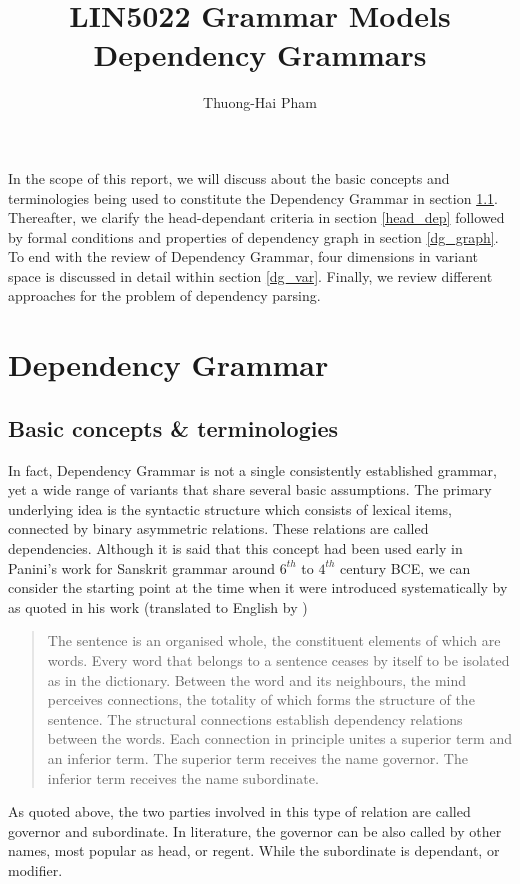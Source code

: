 \documentclass[12pt]{article}
\title{LIN5022 Grammar Models\\Dependency Grammars}
\author{Thuong-Hai Pham}
\begin{document}
\maketitle

In the scope of this report, we will discuss about the basic concepts and terminologies being used to constitute the Dependency Grammar in section \ref{basic}. Thereafter, we clarify the head-dependant criteria in section \ref{head_dep} followed by formal conditions and properties of dependency graph in section \ref{dg_graph}. To end with the review of Dependency Grammar, four dimensions in variant space is discussed in detail within section \ref{dg_var}. Finally, we review different approaches for the problem of dependency parsing.

\section{Dependency Grammar}

\subsection{Basic concepts \& terminologies} \label{basic}
In fact, Dependency Grammar is not a single consistently established grammar, yet a wide range of variants that share several basic assumptions. The primary underlying idea is the syntactic structure which consists of lexical items, connected by binary asymmetric relations. These relations are called dependencies. Although it is said that this concept had been used early in Panini's work for Sanskrit grammar around $6^{th}$ to $4^{th}$ century BCE, we can consider the starting point at the time when it were introduced systematically by \cite{tesniere1959elements} as quoted in his work (translated to English by \cite{nivre2005dependency})
\begin{quote}
	The sentence is an organised whole, the constituent elements of which are words. Every word that belongs to a sentence ceases by itself to be isolated as in the dictionary. Between the word and its neighbours, the mind perceives connections, the totality of which forms the structure of the sentence. The structural connections establish dependency relations between the words. Each connection in principle unites a superior term and an inferior term. The superior term receives the name governor. The inferior term receives the name subordinate.
\end{quote}

As quoted above, the two parties involved in this type of relation are called governor and subordinate. In literature, the governor can be also called by other names, most popular as head, or regent. While the subordinate is dependant, or modifier.
\end{document}
